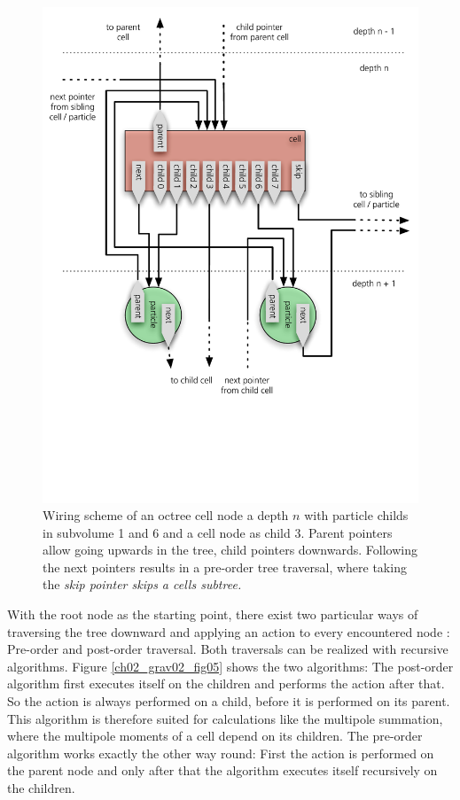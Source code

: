 \begin{figure}[htbp]
\begin{center}
\includegraphics[scale=0.6]{11cell_wiring.pdf}
\caption{Wiring scheme of an octree cell node a depth $n$ with particle childs in subvolume 1 and 6 and a cell node as child 3. Parent pointers allow going upwards in the tree, child pointers downwards. Following the next pointers results in a pre-order tree traversal, where taking the \it{skip} pointer skips a cells subtree.}
\label{ch02_grav02_fig04}
\end{center}
\end{figure}

With the root node as the starting point, there exist two particular ways of traversing the tree downward and applying an action to every encountered node : Pre-order and post-order traversal. Both traversals can be realized with recursive algorithms. Figure \ref{ch02_grav02_fig05} shows the two algorithms: The post-order algorithm first executes itself on the children and performs the action after that. So the action is always performed on a child, before it is performed on its parent. This algorithm is therefore suited for calculations like the multipole summation, where the multipole moments of a cell depend on its children. The pre-order algorithm works exactly the other way round: First the action is performed on the parent node and only after that the algorithm executes itself recursively on the children.

